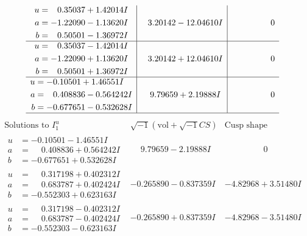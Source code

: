 \documentclass[1p]{elsarticle_modified}
\theoremstyle{definition}
\newcommand{\I}{\sqrt{-1}}
\begin{document}
$$\begin{array}{c|c|c}
\begin{aligned}
u &= \phantom{-}0.35037 + 1.42014 I \\
a &= -1.22090 - 1.13620 I \\
b &= \phantom{-}0.50501 - 1.36972 I\end{aligned}
 & \phantom{-}3.20142 - 12.04610 I & \phantom{-0.000000 } 0 \\ \hline\begin{aligned}
u &= \phantom{-}0.35037 - 1.42014 I \\
a &= -1.22090 + 1.13620 I \\
b &= \phantom{-}0.50501 + 1.36972 I\end{aligned}
 & \phantom{-}3.20142 + 12.04610 I & \phantom{-0.000000 } 0 \\ \hline\begin{aligned}
u &= -0.10501 + 1.46551 I \\
a &= \phantom{-}0.408836 - 0.564242 I \\
b &= -0.677651 - 0.532628 I\end{aligned}
 & \phantom{-}9.79659 + 2.19888 I & \phantom{-0.000000 } 0\\
 \hline 
 \end{array}$$\newpage$$\begin{array}{c|c|c}  
\text{Solutions to }I^u_{1}& \I (\text{vol} + \sqrt{-1}CS) & \text{Cusp shape}\\
 \hline 
\begin{aligned}
u &= -0.10501 - 1.46551 I \\
a &= \phantom{-}0.408836 + 0.564242 I \\
b &= -0.677651 + 0.532628 I\end{aligned}
 & \phantom{-}9.79659 - 2.19888 I & \phantom{-0.000000 } 0 \\ \hline\begin{aligned}
u &= \phantom{-}0.317198 + 0.402312 I \\
a &= \phantom{-}0.683787 + 0.402424 I \\
b &= -0.552303 + 0.623163 I\end{aligned}
 & -0.265890 - 0.837359 I & -4.82968 + 3.51480 I \\ \hline\begin{aligned}
u &= \phantom{-}0.317198 - 0.402312 I \\
a &= \phantom{-}0.683787 - 0.402424 I \\
b &= -0.552303 - 0.623163 I\end{aligned}
 & -0.265890 + 0.837359 I & -4.82968 - 3.51480 I \\ \hline\begin{aligned}

\end{aligned}
\end{array}$$
\end{document}
